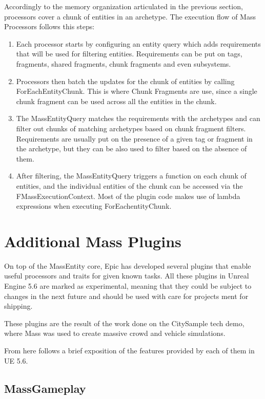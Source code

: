 Accordingly to the memory organization articulated in the previous section, processors cover a chunk of entities in an archetype. The execution flow of Mass Processors follows this steps:

\begin{enumerate}
    \item Each processor starts by configuring an entity query which adds requirements that will be used for filtering entities. Requirements can be put on tags, fragments, shared fragments, chunk fragments and even subsystems.
    \item Processors then batch the updates for the chunk of entities by calling ForEachEntityChunk. This is where Chunk Fragments are use, since a single chunk fragment can be used across all the entities in the chunk.
    \item The MassEntityQuery matches the requirements with the archetypes and can filter out chunks of matching archetypes based on chunk fragment filters. Requirements are usually put on the presence of a given tag or fragment in the archetype, but they can be also used to filter based on the absence of them.
    \item After filtering, the MassEntityQuery triggers a function on each chunk of entities, and the individual entities of the chunk can be accessed via the FMassExecutionContext. Most of the plugin code makes use of lambda expressions when executing ForEachentityChunk.
\end{enumerate}

\section{Additional Mass Plugins}
On top of the MassEntity core, Epic has developed several plugins that enable useful processors and traits for given known tasks. All these plugins in Unreal Engine 5.6 are marked as experimental, meaning that they could be subject to changes in the next future and should be used with care for projects ment for shipping.

These plugins are the result of the work done on the CitySample tech demo, where Mass was used to create massive crowd and vehicle simulations. 

From here follows a brief exposition of the features provided by each of them in UE 5.6.

\subsection{MassGameplay}

